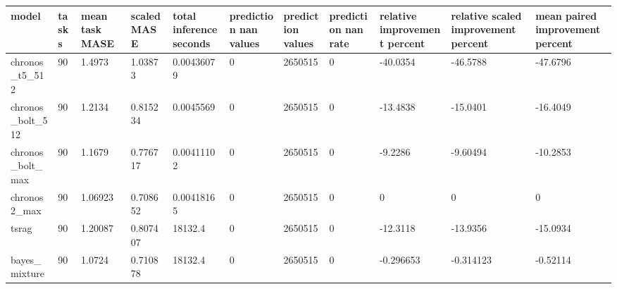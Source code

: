\begin{tabular}{lllllllllll}
\toprule
model & tasks & mean task MASE & scaled MASE & total inference seconds & prediction nan values & prediction values & prediction nan rate & relative improvement percent & relative scaled improvement percent & mean paired improvement percent \\
\midrule
chronos\_t5\_512 & 90 & 1.4973 & 1.03873 & 0.00436079 & 0 & 2650515 & 0 & -40.0354 & -46.5788 & -47.6796 \\
chronos\_bolt\_512 & 90 & 1.2134 & 0.815234 & 0.0045569 & 0 & 2650515 & 0 & -13.4838 & -15.0401 & -16.4049 \\
chronos\_bolt\_max & 90 & 1.1679 & 0.776717 & 0.00411102 & 0 & 2650515 & 0 & -9.2286 & -9.60494 & -10.2853 \\
chronos2\_max & 90 & 1.06923 & 0.708652 & 0.00418165 & 0 & 2650515 & 0 & 0 & 0 & 0 \\
tsrag & 90 & 1.20087 & 0.807407 & 18132.4 & 0 & 2650515 & 0 & -12.3118 & -13.9356 & -15.0934 \\
bayes\_mixture & 90 & 1.0724 & 0.710878 & 18132.4 & 0 & 2650515 & 0 & -0.296653 & -0.314123 & -0.52114 \\
\bottomrule
\end{tabular}
